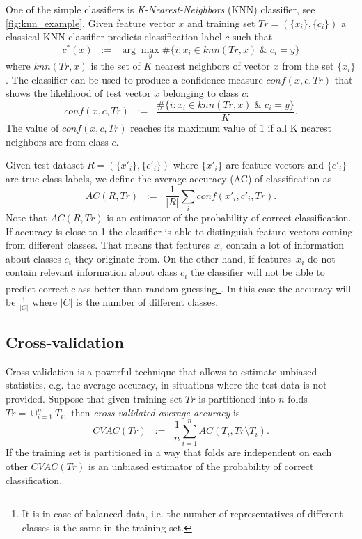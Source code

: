 One of the simple classifiers is \emph{ K-Nearest-Neighbors} (KNN) classifier, see \autoref{fig:knn_example}.
Given feature vector $x$ and training set $Tr=(\{x_i\},\{c_i\})$ a classical KNN classifier predicts classification label $c$ such that 
$$c^*(x)\;\; := \;\; \arg\max_y \#\{i : x_i \in knn(Tr,x) \;\&\; c_i=y \}$$ where $knn(Tr,x)$ is the set of $K$ nearest neighbors of vector $x$ from the set $\{x_i\}$. The classifier can be used to produce a confidence measure $conf(x,c,Tr)$ that shows the likelihood of test vector $x$ belonging to class $c$:
 $$ conf(x,c,Tr) \;\; := \;\; \frac{\#\{i : x_i \in knn(Tr,x) \;\&\; c_i=y \}}{K}. $$ The value of $conf(x,c,Tr)$ reaches its maximum value of $1$ if all K nearest neighbors are from class $c$. %

Given test dataset $R=(\{x'_i\},\{c'_i\})$ where $\{x'_i\}$ are feature vectors and $\{c'_i\}$ are true class labels, we define the average accuracy (AC) of classification as 
\begin{equation}
AC(R,Tr) \;\; := \;\; \frac1{|R|}\sum_i conf(x'_i, c'_i,Tr).
\label{eq:ac}
\end{equation}
Note that $AC(R,Tr)$ is an estimator of the probability of correct classification. If accuracy is close to 1 the classifier is able to distinguish feature vectors coming from different classes. That means that features~$x_i$ contain a lot of information about classes $c_i$ they originate from. On the other hand, if features~$x_i$ do not contain relevant information about class $c_i$ the classifier will not be able to predict correct class better than random guessing\footnote{It is in case of balanced data, i.e. the number of representatives of different classes is the same in the training set.}. In this case the accuracy will be $\frac1{|C|}$ where $|C|$ is the number of different classes. 

\subsection{Cross-validation}

\newcommand{\CVAC}{CV\!\!AC}

Cross-validation is a powerful technique that allows to estimate unbiased statistics, e.g. the average accuracy, in situations where the test data is not provided. Suppose that given training set $Tr$ is partitioned into $n$ folds $Tr=\cup_{i=1}^n T_i,$ then \emph{cross-validated average accuracy} is $$\CVAC(Tr) \;\; := \;\; \frac1n\sum_{i=1}^n AC(T_i,Tr \setminus T_i).$$ If the training set is partitioned in a way that folds are independent on each other $\CVAC(Tr)$ is an unbiased estimator of the probability of correct classification.

